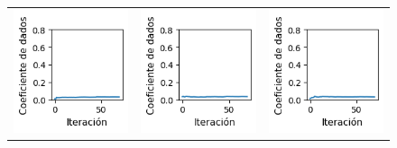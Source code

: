 \begin{figure}[ht]
\begin{tabular}{ccc}
        \includegraphics[width=4cm]{../Plots/dl_epoch_12.png} &
        \includegraphics[width=4cm]{../Plots/dl_epoch_13.png} &
        \includegraphics[width=4cm]{../Plots/dl_epoch_14.png} \\


\end{tabular}
\end{figure}

